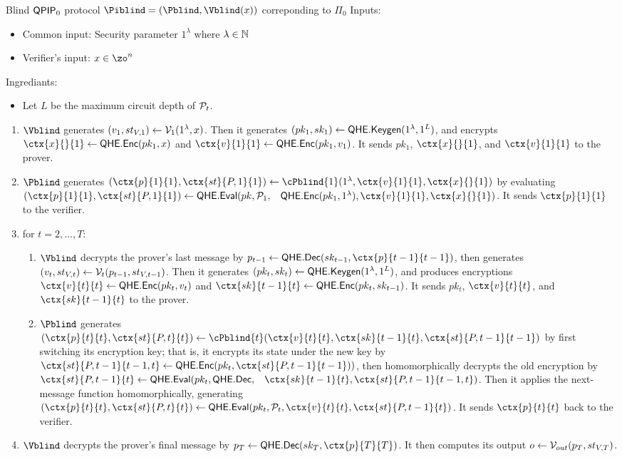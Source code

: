 \begin{protocol}{Blind $\operatorname{\mathsf{QPIP}}_0$ protocol $\Piblind=(\Pblind, \Vblind(x))$ correponding to $\Pi_0$}
	Inputs:
	\begin{itemize}
		\item Common input: Security parameter $1^\lambda$ where $\lambda\in\mathbb{N}$
		\item Verifier's input: $x\in\zo^n$
	\end{itemize}

	Ingrediants:
	\begin{itemize}
		\item Let $L$ be the maximum circuit depth of $\mathcal{P}_t$.
	\end{itemize}

	\begin{enumerate}
		\item $\Vblind$ generates $(v_1, st_{V, 1})\leftarrow\mathcal{V}_1(1^\lambda, x)$.
			Then it generates $(pk_1, sk_1)\leftarrow\mathsf{QHE.Keygen}(1^\lambda, 1^L)$,
			and encrypts $\ctx{x}{}{1}\leftarrow\QEnc(pk_1, x)$ and $\ctx{v}{1}{1}\leftarrow\QEnc(pk_1, v_1)$.
			It sends $pk_1$, $\ctx{x}{}{1}$, and $\ctx{v}{1}{1}$ to the prover.
		\item $\Pblind$ generates $(\ctx{p}{1}{1}, \ctx{st}{P, 1}{1})\leftarrow\cPblind{1}(1^\lambda, \ctx{v}{1}{1}, \ctx{x}{}{1})$
			by evaluating
			$(\ctx{p}{1}{1}, \ctx{st}{P, 1}{1})\leftarrow  \QEval(pk, \cP_1,$ \  $\QEnc(pk_1, 1^\lambda), \ctx{v}{1}{1}, \ctx{x}{}{1})$.
			It sends $\ctx{p}{1}{1}$ to the verifier.
		\item for $t=2,\ldots,T$:
		\begin{enumerate}
			\item $\Vblind$ decrypts the prover's last message by $p_{t-1}\leftarrow\QDec(sk_{t-1}, \ctx{p}{t-1}{t-1})$,
				then generates $(v_t, st_{V, t})\leftarrow\mathcal{V}_t(p_{t-1}, st_{V, t-1})$.
				Then it generates $(pk_t, sk_t)\leftarrow\mathsf{QHE.Keygen}(1^\lambda, 1^L)$,
				and produces encryptions $\ctx{v}{t}{t}\leftarrow\QEnc(pk_t, v_t)$ and $\ctx{sk}{t-1}{t}\leftarrow\QEnc(pk_t, sk_{t-1})$.
				It sends $pk_t$, $\ctx{v}{t}{t}$, and $\ctx{sk}{t-1}{t}$ to the prover.
			\item $\Pblind$ generates $(\ctx{p}{t}{t}, \ctx{st}{P, t}{t})\leftarrow\cPblind{t}(\ctx{v}{t}{t}, \ctx{sk}{t-1}{t}, \ctx{st}{P, t-1}{t-1})$
				by first switching its encryption key;
				that is, it encrypts its state under the new key by $\ctx{st}{P, t-1}{t-1, t}\leftarrow\QEnc(pk_t, \ctx{st}{P, t-1}{t-1}))$,
				then homomorphically decrypts the old encryption by
				$\ctx{st}{P, t-1}{t}\leftarrow\QEval(pk_t, \QDec,$ \ $\ctx{sk}{t-1}{t}, \ctx{st}{P, t-1}{t-1, t})$.
				Then it applies the next-message function homomorphically, generating
				$(\ctx{p}{t}{t}, \ctx{st}{P, t}{t})\leftarrow\QEval(pk_t, \cP_t, \ctx{v}{t}{t}, \ctx{st}{P, t-1}{t})$.
				It sends $\ctx{p}{t}{t}$ back to the verifier.
		\end{enumerate}
		\item $\Vblind$ decrypts the prover's final message by $p_T\leftarrow\QDec(sk_T, \ctx{p}{T}{T})$.
			It then computes its output $o\leftarrow\mathcal{V}_{out}(p_T, st_{V, T})$.
	\end{enumerate}
\end{protocol}

